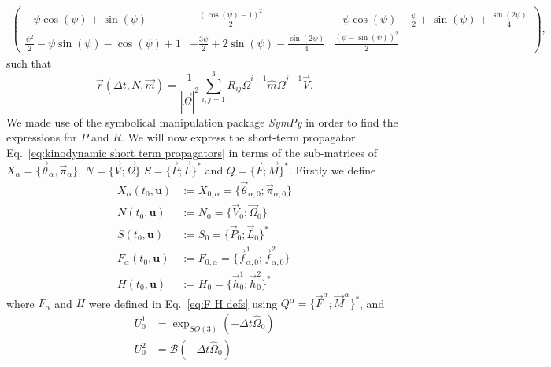 \documentclass[withindex,glossary,techreport]{cam-thesis}
\begin{document}
\begin{appendices}
\begin{equation}
\begin{aligned}
\begin{pmatrix}
- \psi \cos{\left(\psi \right)} + \sin{\left(\psi \right)} & - \frac{\left(\cos{\left(\psi \right)} - 1\right)^{2}}{2} &
 - \psi \cos{\left(\psi \right)} - \frac{\psi}{2} 
 + \sin{\left(\psi \right)} + \frac{\sin{\left(2 \psi \right)}}{4}  \\
\frac{\psi^{2}}{2} - \psi \sin{\left(\psi \right)} - \cos{\left(\psi \right)} + 1 & - \frac{3 \psi}{2} + 2 \sin{\left(\psi \right)} - \frac{\sin{\left(2 \psi \right)}}{4} & \frac{\left(\psi - \sin{\left(\psi \right)}\right)^{2}}{2}
	\end{pmatrix},
\end{aligned}
\end{equation}
\normalsize
such that
\begin{equation} \label{eq:r function SE(3)}
	\vec{r}(\Delta t, N, \vec{m}) = \frac{1}{|\vec{\Omega}|^2} \sum_{i,j=1}^{3} R_{ij} \bar{\Omega}^{i-1} \hat{m} \bar{\Omega}^{j-1} \vec{V}.
\end{equation}
We made use of the symbolical manipulation package \emph{SymPy} \citep{meurerSymPySymbolicComputing2017} in order to find the expressions for $P$ and $R$. We will now express the short-term propagator Eq.~\ref{eq:kinodynamic short term propagators} in terms of the sub-matrices of $X_\alpha = \{ \vec{\theta}_\alpha, \vec{\pi}_\alpha \}$, $N = \{ \vec{V} ; \vec{\Omega} \}$ $S = \{ \vec{P} ; \vec{L} \}^*$ and $Q = \{ \vec{F} ; \vec{M} \}^*$. Firstly we define
\begin{subequations}
	\begin{align}
		X_\alpha(t_0, \mathbf{u}) & := X_{0,\alpha} = \{ \vec{\theta}_{\alpha,0} ; \vec{\pi}_{\alpha,0} \} \\
		N(t_0, \mathbf{u}) & := N_0 = \{ \vec{V}_0 ; \vec{\Omega}_0 \} \\
		S(t_0, \mathbf{u}) & := S_0 = \{ \vec{P}_0 ; \vec{L}_0 \}^* \\
		F_\alpha(t_0, \mathbf{u}) & := F_{0,\alpha} = \{ \vec{f}^1_{\alpha,0} ; \vec{f}^2_{\alpha,0} \} \\
		H(t_0, \mathbf{u}) & := H_0 = \{ \vec{h}^1_0 ; \vec{h}^2_0 \}^*
	\end{align}
\end{subequations}
where $F_\alpha$ and $H$ were defined in Eq.~\ref{eq:F H defs} using $Q^\alpha = \{ \vec{F}^\alpha ; \vec{M}^\alpha \}^*$, and
\begin{subequations}
	\begin{align}
		U^1_0 & = \exp_{SO(3)}(-\Delta t \hat{\Omega}_0) \\
		U^2_0 & = \mathscr{B}(- \Delta t \hat{\Omega}_0) \\

\end{align}
\end{subequations}
\end{appendices}
\end{document}
